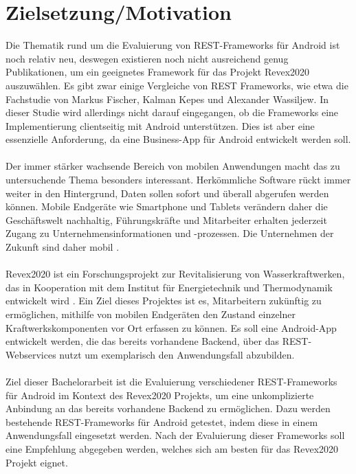 \documentclass[a4paper,11pt,german,public]{INSOexpose}
\begin{document}
\newpage
\section{Zielsetzung/Motivation}

Die Thematik rund um die Evaluierung von REST-Frameworks für Android ist noch relativ neu, deswegen existieren noch nicht ausreichend genug Publikationen, um ein geeignetes Framework für das Projekt Revex2020 auszuwählen. Es gibt zwar einige Vergleiche von REST Frameworks, wie etwa die Fachstudie von Markus Fischer, Kalman Kepes und Alexander Wassiljew\cite{vergleich13}. In dieser Studie wird allerdings nicht darauf eingegangen, ob die Frameworks eine Implementierung clientseitig mit Android unterstützen. Dies ist aber eine essenzielle Anforderung, da eine Business-App für Android entwickelt werden soll. 
\\\\
Der immer stärker wachsende Bereich von mobilen Anwendungen macht das zu untersuchende Thema besonders interessant. Herkömmliche Software rückt immer weiter in den Hintergrund, Daten sollen sofort und überall abgerufen werden können. Mobile Endgeräte wie Smartphone und Tablets verändern daher die Geschäftswelt nachhaltig, Führungskräfte und Mitarbeiter erhalten jederzeit Zugang zu Unternehmensinformationen und -prozessen. Die Unternehmen der Zukunft sind daher mobil \cite{smartMobileApps7}.  
\\\\
Revex2020 ist ein Forschungsprojekt zur Revitalisierung von Wasserkraftwerken, das in Kooperation mit dem Institut für Energietechnik und Thermodynamik entwickelt wird \cite{projektbeschreibung:revex2020}. Ein Ziel dieses Projektes ist es, Mitarbeitern zukünftig zu ermöglichen, mithilfe von mobilen Endgeräten den Zustand einzelner Kraftwerkskomponenten vor Ort erfassen zu können. Es soll eine Android-App entwickelt werden, die das bereits vorhandene Backend, über das REST-Webservices nutzt um exemplarisch den Anwendungsfall abzubilden.
\\\\
Ziel dieser Bachelorarbeit ist die Evaluierung verschiedener REST-Frameworks für Android im Kontext des Revex2020 Projekts, um eine unkomplizierte Anbindung an das bereits vorhandene Backend zu ermöglichen. Dazu werden bestehende REST-Frameworks für Android getestet, indem diese in einem Anwendungsfall eingesetzt werden. Nach der Evaluierung dieser Frameworks soll eine Empfehlung abgegeben werden, welches sich am besten für das Revex2020 Projekt eignet.
\newpage
\end{document}
